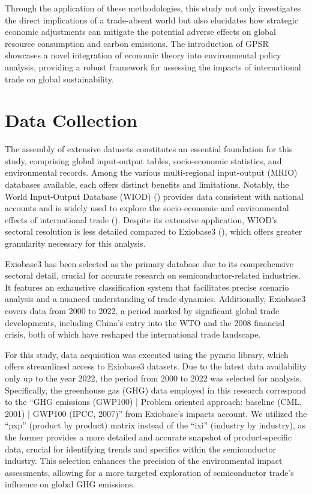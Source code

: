 Through the application of these methodologies, this study not only investigates the direct implications of a trade-absent world but also elucidates how strategic economic adjustments can mitigate the potential adverse effects on global resource consumption and carbon emissions. The introduction of GPSR showcases a novel integration of economic theory into environmental policy analysis, providing a robust framework for assessing the impacts of international trade on global sustainability.

\section{Data Collection}
The assembly of extensive datasets constitutes an essential foundation for this study, comprising global input-output tables, socio-economic statistics, and environmental records. Among the various multi-regional input-output (MRIO) databases available, each offers distinct benefits and limitations. Notably, the World Input-Output Database (WIOD) () provides data consistent with national accounts and is widely used to explore the socio-economic and environmental effects of international trade (). Despite its extensive application, WIOD's sectoral resolution is less detailed compared to Exiobase3 (), which offers greater granularity necessary for this analysis.

Exiobase3 has been selected as the primary database due to its comprehensive sectoral detail, crucial for accurate research on semiconductor-related industries. It features an exhaustive classification system that facilitates precise scenario analysis and a nuanced understanding of trade dynamics. Additionally, Exiobase3 covers data from 2000 to 2022, a period marked by significant global trade developments, including China's entry into the WTO and the 2008 financial crisis, both of which have reshaped the international trade landscape.

For this study, data acquisition was executed using the pymrio library, which offers streamlined access to Exiobase3 datasets. Due to the latest data availability only up to the year 2022, the period from 2000 to 2022 was selected for analysis. Specifically, the greenhouse gas (GHG) data employed in this research correspond to the ``GHG emissions (GWP100) | Problem oriented approach: baseline (CML, 2001) | GWP100 (IPCC, 2007)'' from Exiobase's impacts account. We utilized the ``pxp'' (product by product) matrix instead of the ``ixi'' (industry by industry), as the former provides a more detailed and accurate snapshot of product-specific data, crucial for identifying trends and specifics within the semiconductor industry. This selection enhances the precision of the environmental impact assessments, allowing for a more targeted exploration of semiconductor trade's influence on global GHG emissions.

